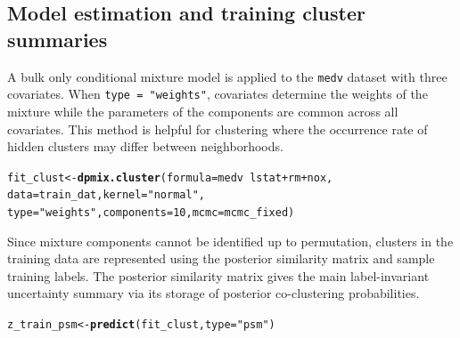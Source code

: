 \documentclass[article]{jss}\usepackage[]{graphicx}\usepackage[]{xcolor}
\makeatletter
\newcommand{\hlnum}[1]{\textcolor[rgb]{0.686,0.059,0.569}{#1}}%
\newcommand{\hlsng}[1]{\textcolor[rgb]{0.192,0.494,0.8}{#1}}%
\newcommand{\hlopt}[1]{\textcolor[rgb]{0,0,0}{#1}}%
\newcommand{\hldef}[1]{\textcolor[rgb]{0.345,0.345,0.345}{#1}}%
\newcommand{\hlkwb}[1]{\textcolor[rgb]{0.69,0.353,0.396}{#1}}%
\newcommand{\hlkwc}[1]{\textcolor[rgb]{0.333,0.667,0.333}{#1}}%
\newcommand{\hlkwd}[1]{\textcolor[rgb]{0.737,0.353,0.396}{\textbf{#1}}}%
\newenvironment{kframe}{%
 \def\at@end@of@kframe{}%
 \ifinner\ifhmode%
  \def\at@end@of@kframe{\end{minipage}}%
  \begin{minipage}{\columnwidth}%
 \fi\fi%
 \def\FrameCommand##1{\hskip\@totalleftmargin \hskip-\fboxsep
 \colorbox{shadecolor}{##1}\hskip-\fboxsep
     \hskip-\linewidth \hskip-\@totalleftmargin \hskip\columnwidth}%
 \MakeFramed {\advance\hsize-\width
   \@totalleftmargin\z@ \linewidth\hsize
   \@setminipage}}%
 {\par\unskip\endMakeFramed%
 \at@end@of@kframe}
\newenvironment{knitrout}{}{} %
\DeclareRobustCommand{\code}[1]{\nolinkurl{#1}}
\makeatother
\begin{document}
\subsection{Model estimation and training cluster summaries}

A bulk only conditional mixture model is applied to the \code{medv}
dataset with three covariates. When \code{type = "weights"},
covariates determine the weights of the mixture while the parameters of the components are common across all covariates. This method is helpful for clustering where the occurrence rate of hidden clusters may differ between neighborhoods.

\begin{knitrout}\footnotesize
{}\color{fgcolor}\begin{kframe}
\begin{alltt}
\hldef{fit_clust} \hlkwb{<-} \hlkwd{dpmix.cluster}\hldef{(} \hlkwc{formula} \hldef{= medv} \hlopt{~} \hldef{lstat} \hlopt{+} \hldef{rm} \hlopt{+} \hldef{nox,}
                              \hlkwc{data}  \hldef{= train_dat,} \hlkwc{kernel}   \hldef{=} \hlsng{"normal"}\hldef{,}
                               \hlkwc{type} \hldef{=} \hlsng{"weights"}\hldef{,} \hlkwc{components} \hldef{=} \hlnum{10}\hldef{,} \hlkwc{mcmc} \hldef{= mcmc_fixed)}
\end{alltt}
\end{kframe}
\end{knitrout}

Since mixture components cannot be identified up to permutation,
clusters in the training data are represented using the posterior
similarity matrix and sample training labels. The posterior similarity
matrix gives the main label-invariant uncertainty summary via its
storage of posterior co-clustering probabilities.

\begin{knitrout}\footnotesize
{}\color{fgcolor}\begin{kframe}
\begin{alltt}
\hldef{z_train_psm} \hlkwb{<-} \hlkwd{predict}\hldef{(fit_clust,} \hlkwc{type} \hldef{=} \hlsng{"psm"}\hldef{)}
\end{alltt}
\end{kframe}
\end{knitrout}
\end{document}
